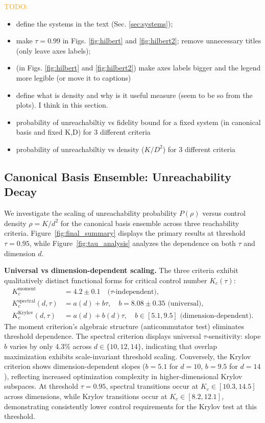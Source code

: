 \documentclass[aps,prx,reprint,superscriptaddress,footnote, twocolumn,notitlepage]{revtex4-2}
\newcommand{\ko}[1]{\textcolor{orange}{#1}}
\begin{document}
\ko{TODO:}
\begin{itemize}
\item  define the systems in the text (Sec. \ref{sec:systems});
\item make $\tau=0.99$ in Figs. \ref{fig:hilbert} and \ref{fig:hilbert2}; remove unnecessary titles (only leave axes labels); 
\item (in Figs. \ref{fig:hilbert} and \ref{fig:hilbert2}) make axes labels bigger and the legend more legible (or move it to captions)
\item  define what is density and why is it useful measure (seem to be so from the plots). I think in this section.
\end{itemize}
\begin{itemize}
    \item probability of unreachabiltiy vs fidelity bound for a fixed system (in canonical basis and fixed K,D) for 3 different criteria
     \item probability of unreachabiltiy vs density ($K/D^2$) for 3 different criteria
\end{itemize}

\subsection{Canonical Basis Ensemble: Unreachability Decay}

We investigate the scaling of unreachability probability $P(\rho)$ versus control density $\rho = K/d^2$ for the canonical basis ensemble across three reachability criteria. Figure~\ref{fig:final_summary} displays the primary results at threshold $\tau = 0.95$, while Figure~\ref{fig:tau_analysis} analyzes the dependence on both $\tau$ and dimension $d$.

\textbf{Universal vs dimension-dependent scaling.} The three criteria exhibit qualitatively distinct functional forms for critical control number $K_c(\tau)$:
\begin{align}
K_c^{\text{moment}} &= 4.2 \pm 0.1 \quad \text{($\tau$-independent)}, \label{eq:Kc_moment}\\
K_c^{\text{spectral}}(d,\tau) &= a(d) + b \tau, \quad b = 8.08 \pm 0.35 \text{ (universal)}, \label{eq:Kc_spectral}\\
K_c^{\text{Krylov}}(d,\tau) &= a(d) + b(d) \tau, \quad b \in [5.1, 9.5] \text{ (dimension-dependent)}. \label{eq:Kc_krylov}
\end{align}
The moment criterion's algebraic structure (anticommutator test) eliminates threshold dependence. The spectral criterion displays universal $\tau$-sensitivity: slope $b$ varies by only 4.3\% across $d \in \{10, 12, 14\}$, indicating that overlap maximization exhibits scale-invariant threshold scaling. Conversely, the Krylov criterion shows dimension-dependent slopes ($b = 5.1$ for $d=10$, $b = 9.5$ for $d=14$), reflecting increased optimization complexity in higher-dimensional Krylov subspaces. At threshold $\tau = 0.95$, spectral transitions occur at $K_c \in [10.3, 14.5]$ across dimensions, while Krylov transitions occur at $K_c \in [8.2, 12.1]$, demonstrating consistently lower control requirements for the Krylov test at this threshold.
\end{document}
